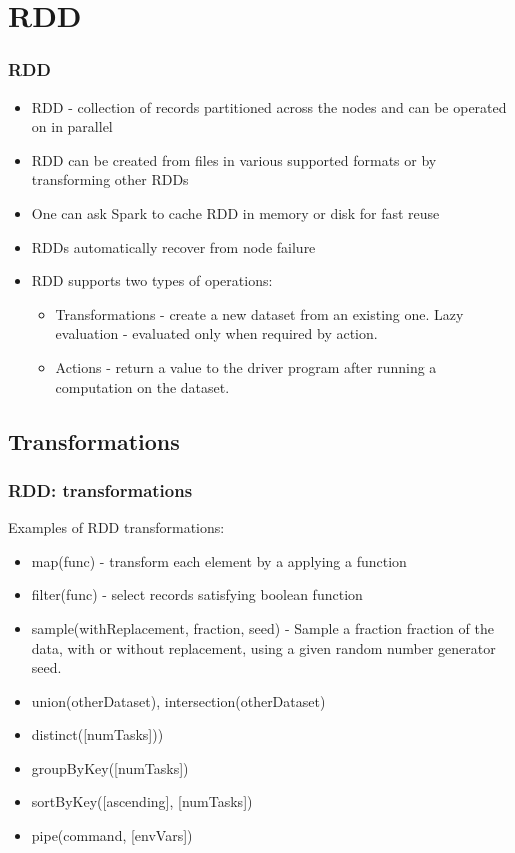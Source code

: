 \section{RDD}

\begin{frame}[fragile]
  \frametitle{RDD}
  
  \begin{itemize}
  \item RDD - collection of records partitioned across the nodes and can be operated on in parallel
  \item RDD can be created from files in various supported formats or by transforming other RDDs
  \item One can ask Spark to {\color{mycolordef}cache RDD in memory or disk} for fast reuse
  \item RDDs automatically recover from node failure
  \item RDD supports two types of operations:
    \begin{itemize}
    \item {\color{mycolordef}Transformations} - create a new dataset from an existing one. Lazy evaluation - evaluated only when required by action.
    \item {\color{mycolordef}Actions} - return a value to the driver program after running a computation on the dataset.
    \end{itemize}
  \end{itemize}  

\end{frame}

\subsection{Transformations}
\begin{frame}
  \frametitle{RDD: transformations}
  Examples of RDD transformations:
  \begin{itemize}
  \item {\color{mycolorcode}map(func)} - transform each element by a applying a function
  \item {\color{mycolorcode}filter(func)} - select records satisfying boolean function
  \item {\color{mycolorcode}sample(withReplacement, fraction, seed)} - Sample a fraction fraction of the data, with or without replacement, using a given random number generator seed.
  \item {\color{mycolorcode}union(otherDataset), intersection(otherDataset)}
  \item {\color{mycolorcode}distinct([numTasks]))}
  \item {\color{mycolorcode}groupByKey([numTasks])}
  \item {\color{mycolorcode}sortByKey([ascending], [numTasks])}
  \item {\color{mycolorcode}pipe(command, [envVars])}
  \end{itemize}
\end{frame}

